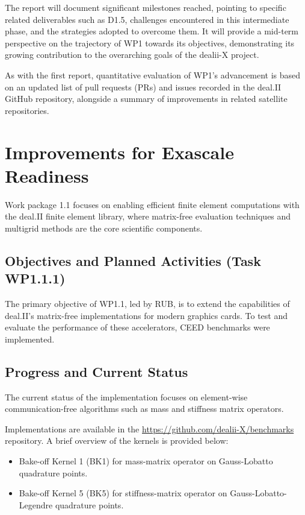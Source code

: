 \documentclass[a4paper,12pt]{article}
\begin{document}
The report will document significant milestones reached, pointing to specific related deliverables such as D1.5, challenges encountered in this intermediate phase, and the strategies adopted to overcome them. It will provide a mid-term perspective on the trajectory of WP1 towards its objectives, demonstrating its growing contribution to the overarching goals of the dealii-X project.

As with the first report, quantitative evaluation of WP1's advancement is based on an updated list of pull requests (PRs) and issues recorded in the deal.II GitHub repository, alongside a summary of improvements in related satellite repositories.%

\section{Improvements for Exascale Readiness}

Work package 1.1 focuses on enabling efficient finite element computations
with the deal.II finite element library, where matrix-free evaluation
techniques and multigrid methods are the core scientific components.

\subsection{Objectives and Planned Activities (Task WP1.1.1)}

The primary objective of WP1.1, led by RUB, is to extend the capabilities of deal.II’s matrix-free implementations for modern graphics cards. To test and evaluate the performance of these accelerators, CEED benchmarks \cite{Kolev2021} were implemented. 

\subsection{Progress and Current Status}

The current status of the implementation focuses on element-wise communication-free algorithms such as mass and stiffness matrix operators. 

Implementations are available in the \url{https://github.com/dealii-X/benchmarks} repository. A brief overview of the kernels is provided below:
\begin{itemize}
\item Bake-off Kernel 1 (BK1) for mass-matrix operator on Gauss-Lobatto quadrature points.
\item Bake-off Kernel 5 (BK5) for stiffness-matrix operator on Gauss-Lobatto-Legendre quadrature points.
\end{itemize}
\end{document}

